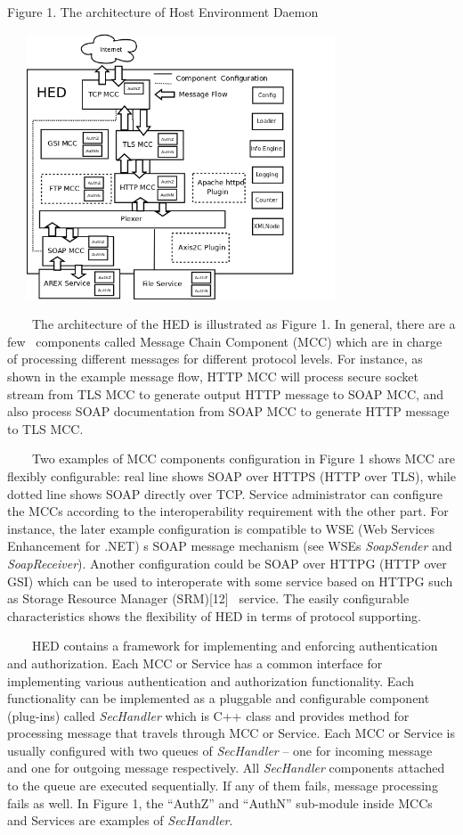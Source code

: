\documentclass{article}
\begin{document}
{\centering
Figure 1. The architecture of Host Environment Daemon
\par}

\begin{center}
\includegraphics[width=4.0673in,height=3.1047in]{Secpaper-img1.png}
\end{center}
\ \ \ \ The architecture of the HED is illustrated as Figure 1. In
general, there are a few \ components called Message Chain Component
(MCC) which are in charge of processing different messages for
different protocol levels. For instance, as shown in the example
message flow, HTTP MCC will process secure socket stream from TLS MCC
to generate output HTTP message to SOAP MCC, and also process SOAP
documentation from SOAP MCC to generate HTTP message to TLS MCC. 

\ \ \ \ Two examples of MCC components configuration in Figure 1 shows
MCC are flexibly configurable: real line shows SOAP over HTTPS (HTTP
over TLS), while dotted line shows SOAP directly over TCP. Service
administrator can configure the MCCs according to the interoperability
requirement with the other part. For instance, the later example
configuration is compatible to WSE (Web Services Enhancement for .NET)
{\textquotesingle}s SOAP message mechanism (see WSE{\textquotesingle}s
\textit{SoapSender} and \textit{SoapReceiver}). Another configuration
could be SOAP over HTTPG (HTTP over GSI) which can be used to
interoperate with some service based on HTTPG such as Storage Resource
Manager (SRM)[12] \ service. The easily configurable characteristics
shows the flexibility of HED in terms of protocol supporting.

\ \ \ \ HED contains a framework for implementing and enforcing
authentication and authorization. Each MCC or Service has a common
interface for implementing various authentication and authorization
functionality. Each functionality can be implemented as a pluggable and
configurable component (plug-ins) called \textit{SecHandler} which is
C++ class and provides method for processing message that travels
through MCC or Service. Each MCC or Service is usually configured with
two queues of \textit{SecHandler} -- one for incoming message and one
for outgoing message respectively. All \textit{SecHandler} components
attached to the queue are executed sequentially. If any of them fails,
message processing fails as well. In Figure 1, the
{\textquotedblleft}AuthZ{\textquotedblright} and
{\textquotedblleft}AuthN{\textquotedblright} sub-module inside MCCs and
Services are examples of \textit{SecHandler}.
\end{document}
